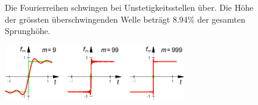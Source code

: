 \begin{figure}[htbp]
	\vspace{-\baselineskip}
	\begin{minipage}[c]{8cm}
		Die Fourierreihen schwingen bei Unstetigkeitsstellen über. Die Höhe der grössten überschwingenden Welle
		beträgt 8.94\% der gesamten Sprunghöhe.
	\end{minipage}
	\begin{minipage}[c]{8cm}
		\includegraphics[width=8cm]{./bilder/gibssches_phaenomen.png}  
	\end{minipage}
\end{figure}
\vspace{-\baselineskip}


